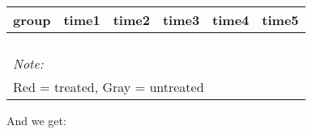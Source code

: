 \documentclass[
]{article}
\begin{document}
\begin{table}
\centering
\begin{tabular}[t]{>{}r|>{}r|>{}r|>{}r|>{}r|>{}r}
\hline
group & time1 & time2 & time3 & time4 & time5\\
\hline
\cellcolor{white}{2} & \cellcolor{red}{\textcolor{black}{0.631}} & \cellcolor{white}{0.711} & \cellcolor{red}{\textcolor{black}{0.814}} & \cellcolor{white}{0.846} & \cellcolor{white}{0.826}\\
\hline
\cellcolor{white}{3} & \cellcolor{white}{\textcolor{black}{0.678}} & \cellcolor{white}{0.770} & \cellcolor{white}{\textcolor{black}{0.664}} & \cellcolor{white}{0.800} & \cellcolor{white}{0.784}\\
\hline
\cellcolor{white}{4} & \cellcolor{lightgray}{\textcolor{black}{0.778}} & \cellcolor{white}{0.807} & \cellcolor{lightgray}{\textcolor{black}{0.673}} & \cellcolor{white}{0.750} & \cellcolor{white}{0.868}\\
\hline
\cellcolor{white}{5} & \cellcolor{lightgray}{\textcolor{black}{0.854}} & \cellcolor{white}{0.939} & \cellcolor{lightgray}{\textcolor{black}{0.854}} & \cellcolor{white}{0.800} & \cellcolor{white}{0.855}\\
\hline
\multicolumn{6}{l}{\rule{0pt}{1em}\textit{Note: }}\\
\multicolumn{6}{l}{\rule{0pt}{1em}Red = treated, Gray = untreated}\\
\end{tabular}
\end{table}

And we get:
\end{document}
